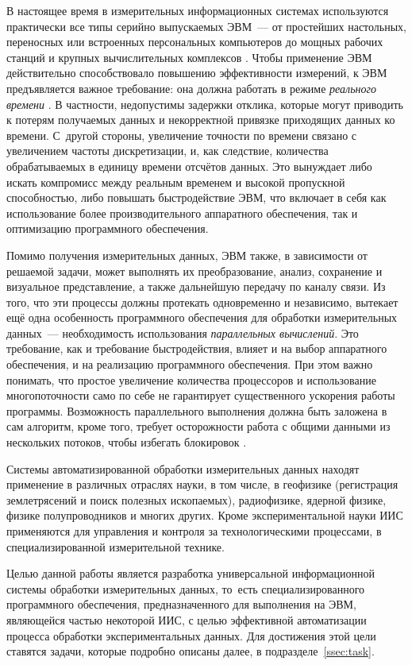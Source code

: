 \documentclass[a4paper, 14pt, titlepage]{extarticle}
\newcommand{\term}[1]{\emph{#1}}
\begin{document}
  В настоящее время в измерительных информационных системах используются практически все типы
  серийно выпускаемых ЭВМ~--- от простейших настольных, переносных или встроенных персональных
  компьютеров до мощных рабочих станций и крупных вычислительных комплексов \cite[с.~149]{rannev-iis}.
  Чтобы применение ЭВМ действительно способствовало повышению эффективности измерений, к ЭВМ
  предъявляется важное требование: она должна работать в режиме \term{реального времени}
  \cite{tessier-reconfigurable}. В частности, недопустимы задержки отклика, которые могут приводить
  к потерям получаемых данных и некорректной привязке приходящих данных ко времени. С~другой
  стороны, увеличение точности по времени связано с увеличением частоты дискретизации, и, как
  следствие, количества обрабатываемых в единицу времени отсчётов данных. Это вынуждает либо искать
  компромисс между реальным временем и высокой пропускной способностью, либо повышать быстродействие
  ЭВМ, что включает в себя как использование более производительного аппаратного обеспечения, так и
  оптимизацию программного обеспечения.

  Помимо получения измерительных данных, ЭВМ также, в зависимости от решаемой задачи, может
  выполнять их преобразование, анализ, сохранение и визуальное представление, а также дальнейшую
  передачу по каналу связи. Из того, что эти процессы должны протекать одновременно и независимо,
  вытекает ещё одна особенность программного обеспечения для обработки измерительных данных~---
  необходимость использования \term{параллельных вычислений}. Это требование, как и требование
  быстродействия, влияет и на выбор аппаратного обеспечения, и на реализацию программного обеспечения.
  При этом важно понимать, что простое увеличение количества процессоров и использование
  многопоточности само по себе не гарантирует существенного ускорения работы программы. Возможность
  параллельного выполнения должна быть заложена в сам алгоритм, кроме того, требует осторожности
  работа с общими данными из нескольких потоков, чтобы избегать блокировок \cite{hoare-csp}.

  Системы автоматизированной обработки измерительных данных находят применение в различных отраслях науки,
  в том числе, в геофизике (регистрация землетрясений и поиск полезных ископаемых), радиофизике,
  ядерной физике, физике полупроводников и многих других. Кроме экспериментальной науки ИИС
  применяются для управления и контроля за технологическими процессами, в специализированной
  измерительной технике.

  Целью данной работы является разработка универсальной информационной системы обработки
  измерительных данных, то~есть специализированного программного обеспечения, предназначенного для
  выполнения на ЭВМ, являющейся частью некоторой ИИС, с целью эффективной автоматизации процесса
  обработки экспериментальных данных. Для достижения этой цели ставятся задачи, которые подробно
  описаны далее, в подразделе~\ref{ssec:task}.
\end{document}
